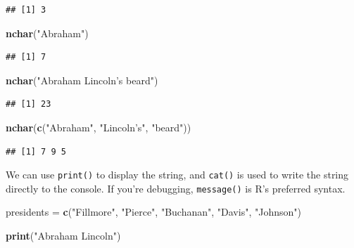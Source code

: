 \documentclass[
]{book}
\newenvironment{Shaded}{\begin{snugshade}}{\end{snugshade}}
\newcommand{\KeywordTok}[1]{\textcolor[rgb]{0.13,0.29,0.53}{\textbf{#1}}}
\newcommand{\NormalTok}[1]{#1}
\newcommand{\StringTok}[1]{\textcolor[rgb]{0.31,0.60,0.02}{#1}}
\begin{document}
\begin{verbatim}
## [1] 3
\end{verbatim}

\begin{Shaded}
\begin{Highlighting}[]
\KeywordTok{nchar}\NormalTok{(}\StringTok{"Abraham"}\NormalTok{)}
\end{Highlighting}
\end{Shaded}

\begin{verbatim}
## [1] 7
\end{verbatim}

\begin{Shaded}
\begin{Highlighting}[]
\KeywordTok{nchar}\NormalTok{(}\StringTok{"Abraham Lincoln's beard"}\NormalTok{)}
\end{Highlighting}
\end{Shaded}

\begin{verbatim}
## [1] 23
\end{verbatim}

\begin{Shaded}
\begin{Highlighting}[]
\KeywordTok{nchar}\NormalTok{(}\KeywordTok{c}\NormalTok{(}\StringTok{"Abraham"}\NormalTok{, }\StringTok{"Lincoln's"}\NormalTok{,}
    \StringTok{"beard"}\NormalTok{))}
\end{Highlighting}
\end{Shaded}

\begin{verbatim}
## [1] 7 9 5
\end{verbatim}

We can use \texttt{print()} to display the string, and \texttt{cat()} is used to write the string directly to the console. If you're debugging, \texttt{message()} is R's preferred syntax.

\begin{Shaded}
\begin{Highlighting}[]
\NormalTok{presidents =}\StringTok{ }\KeywordTok{c}\NormalTok{(}\StringTok{"Fillmore"}\NormalTok{,}
    \StringTok{"Pierce"}\NormalTok{, }\StringTok{"Buchanan"}\NormalTok{,}
    \StringTok{"Davis"}\NormalTok{, }\StringTok{"Johnson"}\NormalTok{)}

\KeywordTok{print}\NormalTok{(}\StringTok{"Abraham Lincoln"}\NormalTok{)}
\end{Highlighting}
\end{Shaded}
\end{document}
